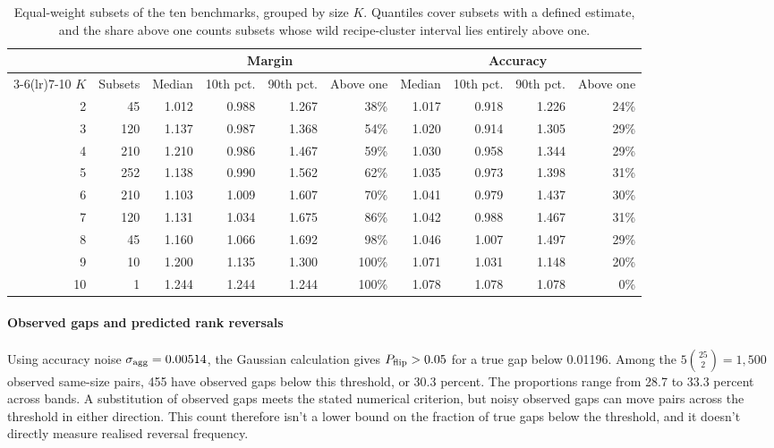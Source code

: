 \begin{table}[h]
\centering
\small
\caption{Equal-weight subsets of the ten benchmarks, grouped by size $K$. Quantiles cover subsets with a defined estimate, and the share above one counts subsets whose wild recipe-cluster interval lies entirely above one.}
\label{tab:fixedk}
\setlength{\tabcolsep}{4pt}
\begin{tabular}{rrrrrrrrrr}
\toprule
& & \multicolumn{4}{c}{Margin} & \multicolumn{4}{c}{Accuracy} \\
\cmidrule(lr){3-6}\cmidrule(lr){7-10}
$K$ & Subsets & Median & 10th pct. & 90th pct. & Above one & Median & 10th pct. & 90th pct. & Above one \\
\midrule
2 & 45 & 1.012 & 0.988 & 1.267 & 38\% & 1.017 & 0.918 & 1.226 & 24\% \\
3 & 120 & 1.137 & 0.987 & 1.368 & 54\% & 1.020 & 0.914 & 1.305 & 29\% \\
4 & 210 & 1.210 & 0.986 & 1.467 & 59\% & 1.030 & 0.958 & 1.344 & 29\% \\
5 & 252 & 1.138 & 0.990 & 1.562 & 62\% & 1.035 & 0.973 & 1.398 & 31\% \\
6 & 210 & 1.103 & 1.009 & 1.607 & 70\% & 1.041 & 0.979 & 1.437 & 30\% \\
7 & 120 & 1.131 & 1.034 & 1.675 & 86\% & 1.042 & 0.988 & 1.467 & 31\% \\
8 & 45 & 1.160 & 1.066 & 1.692 & 98\% & 1.046 & 1.007 & 1.497 & 29\% \\
9 & 10 & 1.200 & 1.135 & 1.300 & 100\% & 1.071 & 1.031 & 1.148 & 20\% \\
10 & 1 & 1.244 & 1.244 & 1.244 & 100\% & 1.078 & 1.078 & 1.078 & 0\% \\
\bottomrule
\end{tabular}
\end{table}


\paragraph{Observed gaps and predicted rank reversals}
Using accuracy noise $\sigma_{\rm agg}=0.00514$, the Gaussian calculation gives $P_{\rm flip}>0.05$ for a true gap below 0.01196. Among the $5\binom{25}{2}=1{,}500$ observed same-size pairs, 455 have observed gaps below this threshold, or 30.3 percent. The proportions range from 28.7 to 33.3 percent across bands. A substitution of observed gaps meets the stated numerical criterion, but noisy observed gaps can move pairs across the threshold in either direction. This count therefore isn't a lower bound on the fraction of true gaps below the threshold, and it doesn't directly measure realised reversal frequency.

